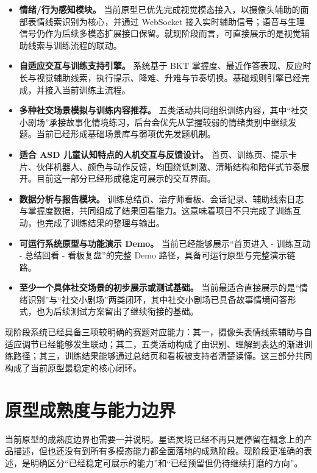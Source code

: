\begin{itemize}
  \item \textbf{情绪/行为感知模块。} 当前原型已优先完成视觉模态接入，以摄像头辅助的面部表情线索识别为核心，并通过 WebSocket 接入实时辅助信号；语音与生理信号仍作为后续多模态扩展接口保留。就现阶段而言，可直接展示的是视觉辅助线索与训练流程的联动。
  \item \textbf{自适应交互与训练支持引擎。} 系统基于 BKT 掌握度、最近作答表现、反应时长与视觉辅助线索，执行提示、降难、升难与节奏切换。基础规则引擎已经完成，并接入当前训练主流程。
  \item \textbf{多种社交场景模拟与训练内容推荐。} 五类活动共同组织训练内容，其中“社交小剧场”承接故事化情境练习，后台会优先从掌握较弱的情绪类别中继续发题。当前已经形成基础场景库与弱项优先发题机制。
  \item \textbf{适合 ASD 儿童认知特点的人机交互与反馈设计。} 首页、训练页、提示卡片、伙伴机器人、颜色与动作反馈，均围绕低刺激、清晰结构和陪伴式节奏展开。目前这一部分已经形成稳定可展示的交互界面。
  \item \textbf{数据分析与报告模块。} 训练总结页、治疗师看板、会话记录、辅助线索日志与掌握度数据，共同组成了结果回看能力。这意味着项目不只完成了训练互动，也完成了训练结果的整理与输出。
  \item \textbf{可运行系统原型与功能演示 Demo。} 当前已经能够展示“首页进入 - 训练互动 - 总结回看 - 看板复盘”的完整 Demo 路径，具备可运行原型与完整演示链路。
  \item \textbf{至少一个具体社交场景的初步展示或测试基础。} 当前最适合直接展示的是“情绪识别”与“社交小剧场”两类闭环，其中社交小剧场已具备故事情境问答形式，也为后续测试方案留出了继续衔接的基础。
\end{itemize}

现阶段系统已经具备三项较明确的赛题对应能力：其一，摄像头表情线索辅助与自适应调节已经能够发生联动；其二，五类活动构成了由识别、理解到表达的渐进训练路径；其三，训练结果能够通过总结页和看板被支持者清楚读懂。这三部分共同构成了当前原型最稳定的核心闭环。

\section{原型成熟度与能力边界}
当前原型的成熟度边界也需要一并说明。星语灵境已经不再只是停留在概念上的产品描述，但也还没有到所有多模态能力都全面落地的成熟阶段。现阶段更准确的表述，是明确区分“已经稳定可展示的能力”和“已经预留但仍待继续打磨的方向”。

